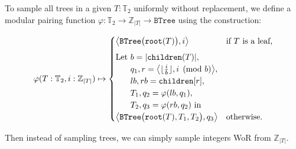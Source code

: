 \documentclass[portrait,a0b,final,a4resizeable]{a0poster}
\def\jointspacing{\vspace{0.3in}}
\begin{document}
\begin{poster}
\begin{multicols}{2}
      \jointspacing


      \jointspacing

      \hspace*{2cm}\begin{minipage}[c]{0.90\columnwidth}
      To sample all trees in a given $T: \mathbb{T}_2$ uniformly without replacement, we define a modular pairing function $\varphi: \mathbb{T}_2 \rightarrow \mathbb{Z}_{|T|} \rightarrow \texttt{BTree}$ using the construction:
      \end{minipage}

      \begin{equation*}
        \varphi(T: \mathbb{T}_2, i: \mathbb{Z}_{|T|}) \mapsto \begin{cases}
          \big\langle\texttt{BTree}\big(\texttt{root}(T)\big), i\big\rangle & \text{if $T$ is a leaf,} \vspace{5pt}\\
          \text{Let } b = |\texttt{children}(T)|,\\
          \phantom{\text{Let }} q_1, r=\big\langle\lfloor\frac{i}{b}\rfloor, i \pmod{b}\big\rangle,\\
          \phantom{\text{Let }} lb, rb = \texttt{children}[r],\\
          \phantom{\text{Let }} T_1, q_2 = \varphi(lb, q_1),\\
          \phantom{\text{Let }} T_2, q_3 = \varphi(rb, q_2) \text{ in } \\
          \big\langle\texttt{BTree}\big(\texttt{root}(T), T_1, T_2\big), q_3\big\rangle & \text{otherwise.} \\
        \end{cases}
      \end{equation*}

      \hspace*{2cm}\begin{minipage}[c]{0.90\columnwidth}
      Then instead of sampling trees, we can simply sample integers WoR from $\mathbb{Z}_{|T|}$.\vspace{1.8cm}
      \end{minipage}

      \jointspacing

    \end{multicols}

    \vspace{-2.2cm}
    \bottombox{

}
\end{poster}
\end{document}
